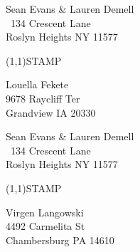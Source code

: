\documentclass[12pt]{article}
\begin{document}
\begin{minipage}{.5\linewidth} \noindent
Sean Evans \& Lauren Demell\\\ 
134 Crescent Lane\\ 
Roslyn Heights NY 11577
\end{minipage}
\begin{minipage}{.5\linewidth \hspace{-.2in} \vspace{-.3in}}
\begin{flushright}
\framebox(1,1){STAMP}
\end{flushright}
\end{minipage}

\begin{center} \begin{Huge} \vspace*{\fill}
Louella Fekete\\
9678 Raycliff Ter\\
Grandview IA 20330\\
\vspace{\fill} \end{Huge} \end{center}

\clearpage

\begin{minipage}{.5\linewidth} \noindent
Sean Evans \& Lauren Demell\\\ 
134 Crescent Lane\\ 
Roslyn Heights NY 11577
\end{minipage}
\begin{minipage}{.5\linewidth \hspace{-.2in} \vspace{-.3in}}
\begin{flushright}
\framebox(1,1){STAMP}
\end{flushright}
\end{minipage}

\begin{center} \begin{Huge} \vspace*{\fill}
Virgen Langowski\\
4492 Carmelita St\\
Chambersburg PA 14610\\
\vspace{\fill} \end{Huge} \end{center}

\clearpage
\end{document}
